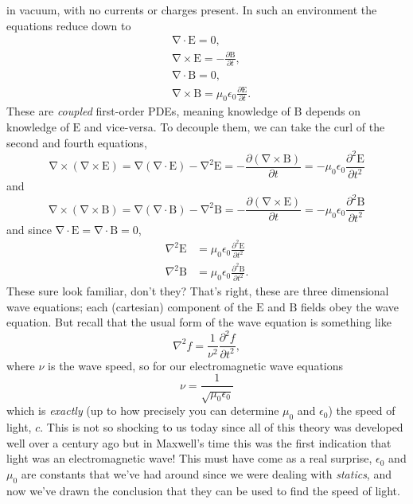 \documentclass[10pt, twocolumn]{article}
\theoremstyle{definition}
\newcommand{\bv}[1]{\bm{\mathrm{#1}}}
\begin{document}
in vacuum, with no currents or charges present. In such an environment the equations reduce down to
\begin{align*}
   & \bv{\nabla}\cdot \bv{E} =0,                                                  \\
   & \bv{\nabla}\times \bv{E} =-\frac{\partial \bv{B}}{\partial t},               \\
   & \bv{\nabla}\cdot \bv{B} =0,                                                  \\
   & \bv{\nabla}\times \bv{B} =\mu_0\epsilon_0\frac{\partial \bv{E}}{\partial t}.
\end{align*}
These are \emph{coupled} first-order PDEs, meaning knowledge of $\bv{B}$ depends on knowledge of $\bv{E}$ and vice-versa. To decouple them, we can take the curl
of the second and fourth equations,
$$\bv{\nabla}\times(\bv{\nabla}\times \bv{E}) =
  \bv{\nabla}(\bv{\nabla}\cdot \bv{E})-\bv{\nabla}^2\bv{E}=
  -\frac{\partial (\bv{\nabla}\times\bv{B})}{\partial t}=-\mu_0\epsilon_0\frac{\partial^2\bv{E}}{\partial t^2}$$
and
$$\bv{\nabla}\times(\bv{\nabla}\times \bv{B}) =
  \bv{\nabla}(\bv{\nabla}\cdot \bv{B})-\bv{\nabla}^2\bv{B}=
  -\frac{\partial (\bv{\nabla}\times\bv{E})}{\partial t}=-\mu_0\epsilon_0\frac{\partial^2\bv{B}}{\partial t^2}$$
and since $\bv{\nabla}\cdot \bv{E}=\bv{\nabla}\cdot \bv{B}=0$,
\begin{align}
  \nabla^2\bv{E} & =\mu_0\epsilon_0\frac{\partial^2\bv{E}}{\partial t^2}  \\
  \nabla^2\bv{B} & =\mu_0\epsilon_0\frac{\partial^2\bv{B}}{\partial t^2}.
\end{align}
These sure look familiar, don't they? That's right, these are three dimensional wave equations; each (cartesian)
component of the $\bv{E}$ and $\bv{B}$ fields obey the wave equation. But recall that the usual form of the wave equation is something like
$$\nabla^2 f=\frac{1}{\nu^2}\frac{\partial^2 f}{\partial t^2},$$
where $\nu$ is the wave speed, so for our electromagnetic wave equations
$$\nu=\frac{1}{\sqrt{\mu_0\epsilon_0}}$$
which is \emph{exactly} (up to how precisely you can determine $\mu_0$ and $\epsilon_0$) the speed of light, $c$. This is not so shocking to us
today since all of this theory was developed well over a century ago but in Maxwell's time this was the first indication that light was an electromagnetic wave!
This must have come as a real surprise, $\epsilon_0$ and $\mu_0$ are constants that we've had around since we were dealing with \emph{statics}, and now we've
drawn the conclusion that they can be used to find the speed of light.
\end{document}
